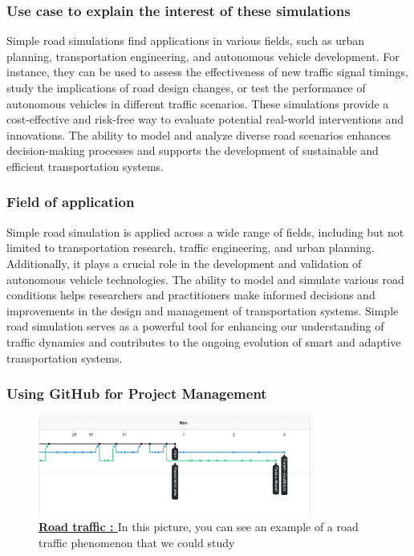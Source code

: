 \documentclass{article}
\begin{document}
		\subsubsection{Use case to explain the interest of these simulations}
		Simple road simulations find applications in various fields, such as urban planning, transportation engineering, and autonomous vehicle development. For instance, they can be used to assess the effectiveness of new traffic signal timings, study the implications of road design changes, or test the performance of autonomous vehicles in different traffic scenarios. These simulations provide a cost-effective and risk-free way to evaluate potential real-world interventions and innovations. The ability to model and analyze diverse road scenarios enhances decision-making processes and supports the development of sustainable and efficient transportation systems.
		
		\subsubsection{Field of application}
		Simple road simulation is applied across a wide range of fields, including but not limited to transportation research, traffic engineering, and urban planning. Additionally, it plays a crucial role in the development and validation of autonomous vehicle technologies. The ability to model and simulate various road conditions helps researchers and practitioners make informed decisions and improvements in the design and management of transportation systems. Simple road simulation serves as a powerful tool for enhancing our understanding of traffic dynamics and contributes to the ongoing evolution of smart and adaptive transportation systems.
	
	\subsubsection{Using GitHub for Project Management}
	
	\begin{figure}[H]
		\centering
		\includegraphics[width=0.8\textwidth]{GitHub.jpg}
		\caption{\textbf{\underline{Road traffic : }} In this picture, you can see an example of a road traffic phenomenon that we could study}
		\label{fig:GitHub}
	\end{figure}
	
\end{document}
